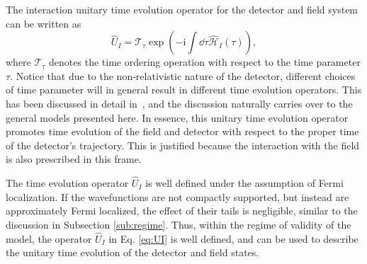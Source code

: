 \documentclass[prd,twocolumn,superscriptaddress,floatfix,amsmath,amssymb,amsfonts,longbibliography,nofootinbib]{revtex4-1}
\newcommand{\ii}{\mathrm{i}}
\begin{document}
The interaction unitary time evolution operator for the detector and field system can be written as
\begin{equation}\label{eq:UI}
    \hat{U}_I = \mathcal{T}_\tau\exp\left(-\ii \int \dd \tau  \hat{\mathcal{H}}_I(\tau) \right),
\end{equation}
where $\mathcal{T}_\tau$ denotes the time ordering operation with respect to the time parameter $\tau$. Notice that due to the non-relativistic nature of the detector, different choices of time parameter will in general result in different time evolution operators. This has been discussed in detail in~\cite{us2}, and the discussion naturally carries over to the general models presented here. In essence, this unitary time evolution operator promotes time evolution of the field and detector with respect to the proper time of the detector's trajectory. This is justified because the interaction with the field is also prescribed in this frame. 

The time evolution operator $\hat{U}_I$ is well defined under the assumption of Fermi localization. If the wavefunctions are not compactly supported, but instead are approximately Fermi localized, the effect of their tails is negligible, similar to the discussion in Subsection \ref{sub:regime}. Thus, within the regime of validity of the model, the operator $\hat{U}_I$ in Eq. \eqref{eq:UI} is well defined, and can be used to describe the unitary time evolution of the detector and field states.
\end{document}
